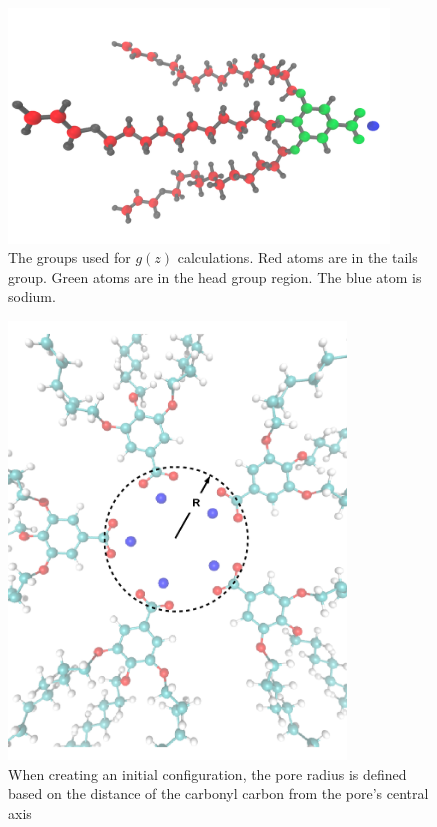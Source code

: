 \documentclass{article}
\begin{document}
  \begin{figure}
	\centering
        \includegraphics[width=0.9\textwidth]{monomer_color_coded.png}
	\caption{The groups used for $g(z)$ calculations. Red atoms are in the
		tails group. Green atoms are in the head group region. The blue atom is sodium. 
		}\label{fig:monomer_color_coded}
  \end{figure}

  \begin{figure}
	\centering
	\includegraphics[width=0.8\textwidth]{pore_radius_illustration.png}
	\caption{When creating an initial configuration, the pore radius is defined based
	on the distance of the carbonyl carbon from the pore's central axis}
	\label{fig:pore_radius_illustration}
  \end{figure}
\end{document}
